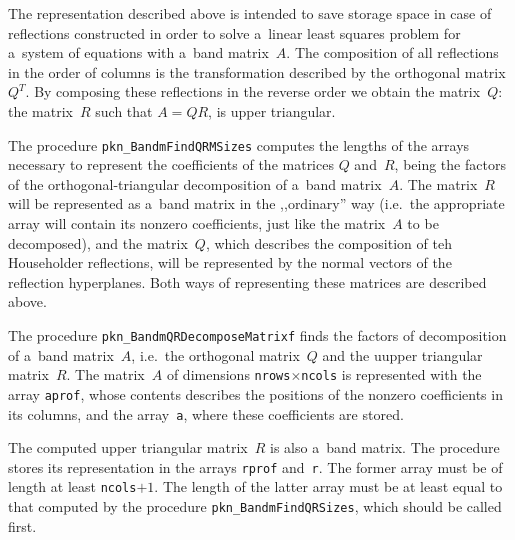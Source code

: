 The representation described above is intended to save storage space
in case of reflections constructed in order to solve a~linear least squares
problem for a~system of equations with a~band matrix~$A$.
The composition of all reflections in the order of columns is the
transformation described by the orthogonal matrix $Q^T$. By composing
these reflections in the reverse order we obtain the matrix~$Q$:
the matrix~$R$ such that $A=QR$, is upper triangular.

\vspace{\bigskipamount}
The procedure \texttt{pkn\_BandmFindQRMSizes} computes the lengths
of the arrays necessary to represent the coefficients of the matrices
$Q$ and~$R$, being the factors of the orthogonal-triangular decomposition
of a~band matrix~$A$.
The matrix~$R$ will be represented as a~band matrix in the ,,ordinary''
way (i.e.\ the appropriate array will contain its nonzero coefficients,
just like the matrix~$A$ to be decomposed), and the matrix~$Q$, which
describes the composition of teh Householder reflections, will be
represented by the normal vectors of the reflection hyperplanes.
Both ways of representing these matrices are described above.

\vspace{\bigskipamount}
The procedure \texttt{pkn\_BandmQRDecomposeMatrixf} finds the factors
of decomposition of a~band matrix~$A$, i.e.\ the orthogonal matrix~$Q$
and the uupper triangular matrix~$R$. The matrix~$A$ of dimensions
\texttt{nrows}$\times$\texttt{ncols} is represented with the array
\texttt{aprof}, whose contents describes the positions of the
nonzero coefficients in its columns, and the array~\texttt{a},
where these coefficients are stored.

The computed upper triangular matrix~$R$ is also a~band matrix.
The procedure stores its representation in the arrays
\texttt{rprof} and~\texttt{r}. The former array must be of length
at least \texttt{ncols}$+1$. The length of the latter array must be
at least equal to that computed by the procedure
\texttt{pkn\_BandmFindQRSizes}, which should be called first.

